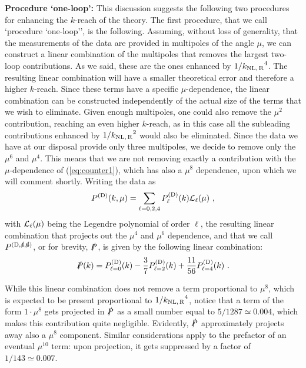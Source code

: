 \documentclass[12pt,a4paper]{article}
\def\PA{\slashed{P}}
\renewcommand{\(}{\left(}
\renewcommand{\)}{\right)}
\def\be{\begin{equation}}
\def\ee{\end{equation}}
\def\knlr{{k_{\rm NL,\,R}}}
\begin{document}
{\bf Procedure `one-loop':} This {discussion suggests} the following two procedures for enhancing the $k$-reach of the theory. The first procedure, that we call `procedure `one-loop'', is the following. Assuming, without loss of generality, that the measurements of the data are provided in multipoles of the angle $\mu$, we can construct a linear combination of the multipoles that removes the largest two-loop contributions. As we said, these are the ones enhanced by $1/\knlr^4$. The resulting linear combination will have a smaller theoretical error and therefore {a} higher $k$-reach. Since these terms have a specific $\mu$-dependence, the linear combination can be constructed independently of the actual size of the terms that we wish to eliminate.  Given enough multipoles, one could also remove the $\mu^2$ contribution, reaching an even higher $k$-reach, as in this case all the {subleading contributions} enhanced by $1/\knlr^2$ would also be eliminated. Since the data we have at our disposal provide only three multipoles, we decide to remove only the $\mu^6$ and $\mu^4$. This means that we are not removing exactly a contribution with the $\mu$-dependence of (\ref{eq:counter1}), which has also a $\mu^8$ dependence, upon which we will comment shortly. Writing the data as
\be
P^{\rm (D)}(k,\mu)=\sum_{\ell=0,2,4} P_\ell^{\rm (D)}(k) {\cal{L}}_\ell(\mu)\ ,
\ee
with $ {\cal{L}}_\ell(\mu)$ being the Legendre polynomial of order $\ell$, the resulting linear combination that projects out  the $\mu^4$ and $\mu^6$ dependence, and that we call $P^{\rm (D,\slashed{4},\slashed{6})}$, or for brevity, $\PA$, is given by the following linear combination:
\be\label{eq:Pslash}
\PA(k)=P_{\ell=0}^{\rm (D)}(k)-\frac{3}{7}P_{\ell=2}^{\rm (D)}(k)+\frac{11}{56}P_{\ell=4}^{\rm (D)}(k)\ .
\ee

While this linear combination does not remove a term proportional to $\mu^8$, which is expected to be present proportional to $1/\knlr^4$, notice that a term of the form $1\cdot\mu^8$ gets projected in $\PA$ as a small number equal to $5/1287\simeq 0.004$, which makes this contribution quite negligible. Evidently, $\PA$ approximately projects away also a $\mu^8$ component. Similar considerations apply to {the prefactor of an eventual} $\mu^{10}$ term: upon projection, it gets suppressed by a factor of $1/143\simeq 0.007$.
\end{document}
